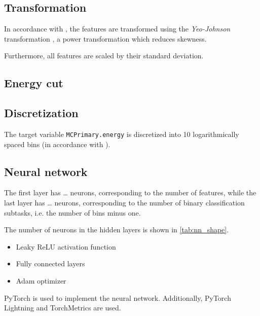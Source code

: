 \subsection{Transformation}
In accordance with \cite{dsea_jan},
the features are transformed using the \emph{Yeo-Johnson} transformation \cite{yeo_johnson},
a power transformation which reduces skewness.

Furthermore, all features are scaled by their standard deviation.


\subsection{Energy cut}


\subsection{Discretization}
The target variable \texttt{MCPrimary.energy} is discretized into \num{10} logarithmically spaced bins
(in accordance with \cite{dsea_samuel}).



\subsection{Neural network}
The first layer has … neurons,
  corresponding to the number of features,
while the last layer has … neurons,
  corresponding to the number of binary classification subtasks,
    i.e. the number of bins minus one.

The number of neurons in the hidden layers is shown in \autoref{tab:nn_shape}.
\begin{itemize}
  \item Leaky ReLU activation function
  \item Fully connected layers
  \item Adam optimizer
\end{itemize}

PyTorch \cite{pytorch} is used to implement the neural network.
Additionally, PyTorch Lightning \cite{pytorch_lightning} and TorchMetrics \cite{torch_metrics} are used.

